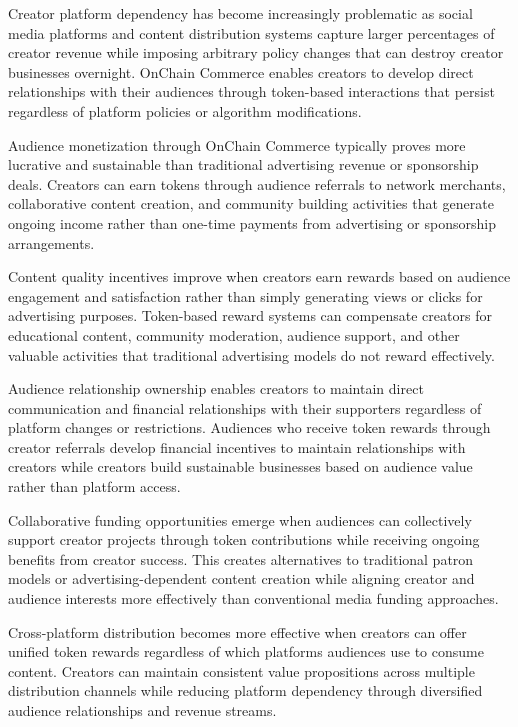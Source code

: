 \documentclass[
  Letterpaper,
]{scrbook}
\begin{document}
Creator platform dependency has become increasingly problematic as
social media platforms and content distribution systems capture larger
percentages of creator revenue while imposing arbitrary policy changes
that can destroy creator businesses overnight. OnChain Commerce enables
creators to develop direct relationships with their audiences through
token-based interactions that persist regardless of platform policies or
algorithm modifications.

Audience monetization through OnChain Commerce typically proves more
lucrative and sustainable than traditional advertising revenue or
sponsorship deals. Creators can earn tokens through audience referrals
to network merchants, collaborative content creation, and community
building activities that generate ongoing income rather than one-time
payments from advertising or sponsorship arrangements.

Content quality incentives improve when creators earn rewards based on
audience engagement and satisfaction rather than simply generating views
or clicks for advertising purposes. Token-based reward systems can
compensate creators for educational content, community moderation,
audience support, and other valuable activities that traditional
advertising models do not reward effectively.

Audience relationship ownership enables creators to maintain direct
communication and financial relationships with their supporters
regardless of platform changes or restrictions. Audiences who receive
token rewards through creator referrals develop financial incentives to
maintain relationships with creators while creators build sustainable
businesses based on audience value rather than platform access.

Collaborative funding opportunities emerge when audiences can
collectively support creator projects through token contributions while
receiving ongoing benefits from creator success. This creates
alternatives to traditional patron models or advertising-dependent
content creation while aligning creator and audience interests more
effectively than conventional media funding approaches.

Cross-platform distribution becomes more effective when creators can
offer unified token rewards regardless of which platforms audiences use
to consume content. Creators can maintain consistent value propositions
across multiple distribution channels while reducing platform dependency
through diversified audience relationships and revenue streams.
\end{document}
